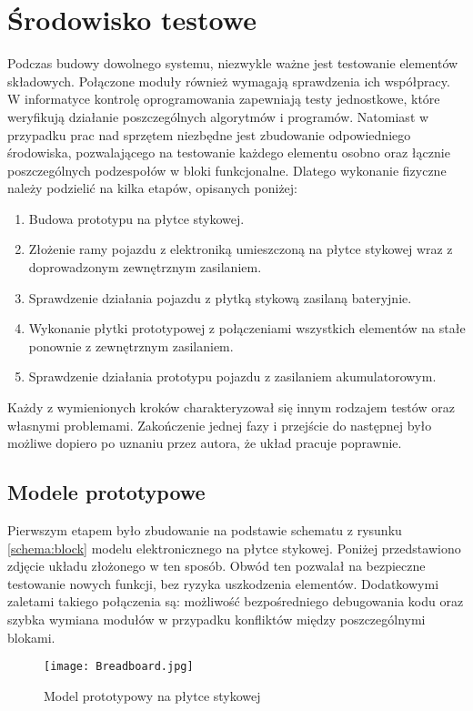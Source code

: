 \section{Środowisko testowe}
\label{sec:testing}
    Podczas budowy dowolnego systemu, niezwykle ważne jest testowanie elementów składowych.
    Połączone moduły również wymagają sprawdzenia ich współpracy.
    W informatyce kontrolę oprogramowania zapewniają testy jednostkowe, które weryfikują działanie poszczególnych algorytmów i programów.
    Natomiast w przypadku prac nad sprzętem niezbędne jest zbudowanie odpowiedniego środowiska, pozwalającego na testowanie każdego elementu osobno oraz łącznie poszczególnych podzespołów w bloki funkcjonalne.
    Dlatego wykonanie fizyczne należy podzielić na kilka etapów, opisanych poniżej:
    \begin{enumerate}
        \item Budowa prototypu na płytce stykowej.
        \item Złożenie ramy pojazdu z elektroniką umieszczoną na płytce stykowej wraz z doprowadzonym zewnętrznym zasilaniem.
        \item Sprawdzenie działania pojazdu z płytką stykową zasilaną bateryjnie.
        \item Wykonanie płytki prototypowej z połączeniami wszystkich elementów na stałe ponownie z zewnętrznym zasilaniem.
        \item Sprawdzenie działania prototypu pojazdu z zasilaniem akumulatorowym.
    \end{enumerate}
    Każdy z wymienionych kroków charakteryzował się innym rodzajem testów oraz własnymi problemami.
    Zakończenie jednej fazy i przejście do następnej było możliwe dopiero po uznaniu przez autora, że układ pracuje poprawnie.

    \subsection{Modele prototypowe}
        Pierwszym etapem było zbudowanie na podstawie schematu z rysunku \ref{schema:block} modelu elektronicznego na płytce stykowej.
        Poniżej przedstawiono zdjęcie układu złożonego w ten sposób.
        Obwód ten pozwalał na bezpieczne testowanie nowych funkcji, bez ryzyka uszkodzenia elementów.
        Dodatkowymi zaletami takiego połączenia są: możliwość bezpośredniego debugowania kodu oraz szybka wymiana modułów w przypadku konfliktów między poszczególnymi blokami.
        \begin{figure}[!ht]
            \centering
            \texttt{[image: Breadboard.jpg]}
            \caption{Model prototypowy na płytce stykowej}
            \label{fig:breadboard}
        \end{figure}

